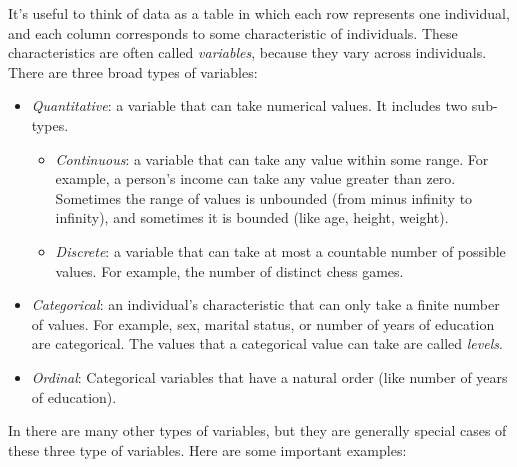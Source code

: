 It's useful to think of data as a table in which each row represents one
individual, and each column corresponds to some characteristic of
individuals. These characteristics are often called \emph{variables}, because they
vary across individuals. There are three broad types of variables:
\begin{itemize}
\item \emph{Quantitative}: a variable that can take numerical values. It
  includes two sub-types.
  \begin{itemize}
  \item \emph{Continuous}: a variable that can take any value within
    some range. For example, a person's income can take any value greater than
    zero. Sometimes the range of values is unbounded (from minus infinity to
    infinity), and sometimes it is bounded (like age, height, weight).
  \item \emph{Discrete}: a variable that can take at most a countable number
    of possible values. For example, the number of distinct chess games. 
  \end{itemize}
\item \emph{Categorical}: an individual's characteristic that can only take a
finite number of values. For example, sex, marital status, or number of years
of education are categorical. The values that a categorical value can take are
called \emph{levels}.  \item \emph{Ordinal}: Categorical variables that have a
natural order (like number of years of education).
\end{itemize}

In \R there are many other types of variables, but they are generally special
cases of these three type of variables. Here are some important examples:

